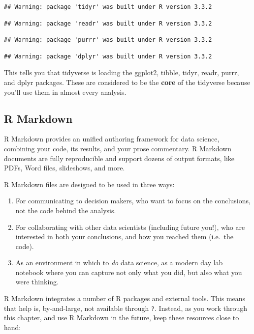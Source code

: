 \documentclass[]{book}
\theoremstyle{definition}
\theoremstyle{definition}
\theoremstyle{remark}
\begin{document}
\begin{verbatim}
## Warning: package 'tidyr' was built under R version 3.3.2
\end{verbatim}

\begin{verbatim}
## Warning: package 'readr' was built under R version 3.3.2
\end{verbatim}

\begin{verbatim}
## Warning: package 'purrr' was built under R version 3.3.2
\end{verbatim}

\begin{verbatim}
## Warning: package 'dplyr' was built under R version 3.3.2
\end{verbatim}

This tells you that tidyverse is loading the ggplot2, tibble, tidyr,
readr, purrr, and dplyr packages. These are considered to be the
\textbf{core} of the tidyverse because you'll use them in almost every
analysis.

\subsection{R Markdown}\label{r-markdown}

R Markdown provides an unified authoring framework for data science,
combining your code, its results, and your prose commentary. R Markdown
documents are fully reproducible and support dozens of output formats,
like PDFs, Word files, slideshows, and more.

R Markdown files are designed to be used in three ways:

\begin{enumerate}
\def\labelenumi{\arabic{enumi}.}
\item
  For communicating to decision makers, who want to focus on the
  conclusions, not the code behind the analysis.
\item
  For collaborating with other data scientists (including future you!),
  who are interested in both your conclusions, and how you reached them
  (i.e.~the code).
\item
  As an environment in which to \emph{do} data science, as a modern day
  lab notebook where you can capture not only what you did, but also
  what you were thinking.
\end{enumerate}

R Markdown integrates a number of R packages and external tools. This
means that help is, by-and-large, not available through \texttt{?}.
Instead, as you work through this chapter, and use R Markdown in the
future, keep these resources close to hand:
\end{document}
